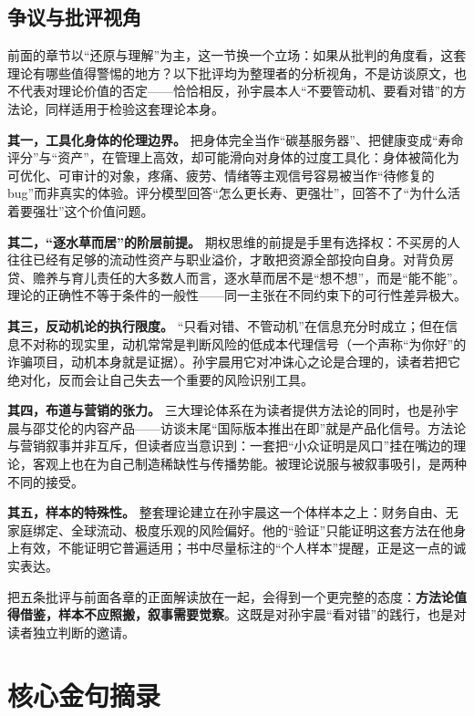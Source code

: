 \section{争议与批评视角}

前面的章节以``还原与理解''为主，这一节换一个立场：如果从批判的角度看，这套理论有哪些值得警惕的地方？以下批评均为整理者的分析视角，不是访谈原文，也不代表对理论价值的否定------恰恰相反，孙宇晨本人``不要管动机、要看对错''的方法论，同样适用于检验这套理论本身。

\textbf{其一，工具化身体的伦理边界。}
把身体完全当作``碳基服务器''、把健康变成``寿命评分''与``资产''，在管理上高效，却可能滑向对身体的过度工具化：身体被简化为可优化、可审计的对象，疼痛、疲劳、情绪等主观信号容易被当作``待修复的
bug''而非真实的体验。评分模型回答``怎么更长寿、更强壮''，回答不了``为什么活着要强壮''这个价值问题。

\textbf{其二，``逐水草而居''的阶层前提。}
期权思维的前提是手里有选择权：不买房的人往往已经有足够的流动性资产与职业溢价，才敢把资源全部投向自身。对背负房贷、赡养与育儿责任的大多数人而言，逐水草而居不是``想不想''，而是``能不能''。理论的正确性不等于条件的一般性------同一主张在不同约束下的可行性差异极大。

\textbf{其三，反动机论的执行限度。}
``只看对错、不管动机''在信息充分时成立；但在信息不对称的现实里，动机常常是判断风险的低成本代理信号（一个声称``为你好''的诈骗项目，动机本身就是证据）。孙宇晨用它对冲诛心之论是合理的，读者若把它绝对化，反而会让自己失去一个重要的风险识别工具。

\textbf{其四，布道与营销的张力。}
三大理论体系在为读者提供方法论的同时，也是孙宇晨与邵艾伦的内容产品------访谈末尾``国际版本推出在即''就是产品化信号。方法论与营销叙事并非互斥，但读者应当意识到：一套把``小众证明是风口''挂在嘴边的理论，客观上也在为自己制造稀缺性与传播势能。被理论说服与被叙事吸引，是两种不同的接受。

\textbf{其五，样本的特殊性。}
整套理论建立在孙宇晨这一个体样本之上：财务自由、无家庭绑定、全球流动、极度乐观的风险偏好。他的``验证''只能证明这套方法在他身上有效，不能证明它普遍适用；书中尽量标注的``个人样本''提醒，正是这一点的诚实表达。

把五条批评与前面各章的正面解读放在一起，会得到一个更完整的态度：\textbf{方法论值得借鉴，样本不应照搬，叙事需要觉察}。这既是对孙宇晨``看对错''的践行，也是对读者独立判断的邀请。

\chapter{核心金句摘录}

